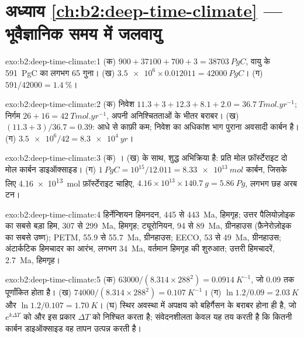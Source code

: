 \section*{अध्याय \ref{ch:b2:deep-time-climate} --- भूवैज्ञानिक समय में जलवायु}

\begin{solution}{exo:b2:deep-time-climate:1}
(क) $900 + 37100 + 700 + 3 = \qty{38703}{PgC}$, वायु के \qty{591}{PgC} का लगभग 65 गुना।
(ख) $\num{3.5e6}\times0.012011 = \qty{42000}{PgC}$। (ग) $591/42000 = \qty{1.4}{\percent}$।
\end{solution}

\begin{solution}{exo:b2:deep-time-climate:2}
(क) निवेश $11.3 + 3 + 12.3 + 8.1 + 2.0 = \qty{36.7}{Tmol.yr^{-1}}$; निर्गम $26 + 16 =
\qty{42}{Tmol.yr^{-1}}$, अपनी अनिश्चितताओं के भीतर बराबर। (ख) $(11.3 + 3)/36.7 = 0.39$: आधे से
काफ़ी कम; निवेश का अधिकांश भाग पुराना अवसादी कार्बन है। (ग) $\num{3.5e6}/42 = \qty{8.3e4}{yr}$।
\end{solution}

\begin{solution}{exo:b2:deep-time-climate:3}
(क) । (ख)  के साथ, शुद्ध अभिक्रिया  है: प्रति मोल
फ़ॉर्स्टेराइट दो मोल कार्बन डाइऑक्साइड। (ग) $\qty{1}{PgC} = 10^{15}/12.011 =
\qty{8.33e13}{mol}$ कार्बन, जिसके लिए \qty{4.16e13}{mol} फ़ॉर्स्टेराइट चाहिए, $4.16\times10^{13}
\times\qty{140.7}{g} = \qty{5.86}{Pg}$, लगभग छह अरब टन।
\end{solution}

\begin{solution}{exo:b2:deep-time-climate:4}
हिर्नेन्शियन हिमनदन, 445 से \qty{443}{Ma}, हिमगृह; उत्तर पैलियोज़ोइक का सबसे बड़ा हिम, 307 से
\qty{299}{Ma}, हिमगृह; ट्यूरोनियन, 94 से \qty{89}{Ma}, ग्रीनहाउस (फ़ैनेरोज़ोइक का सबसे उष्ण);
PETM, 55.9 से \qty{55.7}{Ma}, ग्रीनहाउस; EECO, 53 से \qty{49}{Ma}, ग्रीनहाउस; अंटार्कटिक हिमचादर
का आरंभ, लगभग \qty{34}{Ma}, वर्तमान हिमगृह की शुरुआत; उत्तरी हिमचादरें,
\qty{2.7}{Ma}, हिमगृह।
\end{solution}

\begin{solution}{exo:b2:deep-time-climate:5}
(क) $63000/(8.314\times288^2) = \qty{0.0914}{K^{-1}}$, जो 0.09 तक पूर्णांकित होता है। (ख) $74000/(8.314
\times288^2) = \qty{0.107}{K^{-1}}$। (ग) $\ln1.2/0.09 = \qty{2.03}{K}$ और $\ln 1.2/0.107 =
\qty{1.70}{K}$। (घ) स्थिर अवस्था में अपक्षय को बहिर्गैसन के बराबर होना ही है, जो $e^{k
\Delta T}$ को और इस प्रकार $\Delta T$ को निश्चित करता है; संवेदनशीलता केवल यह तय करती है कि कितनी
कार्बन डाइऑक्साइड वह तापन उत्पन्न करती है।
\end{solution}

